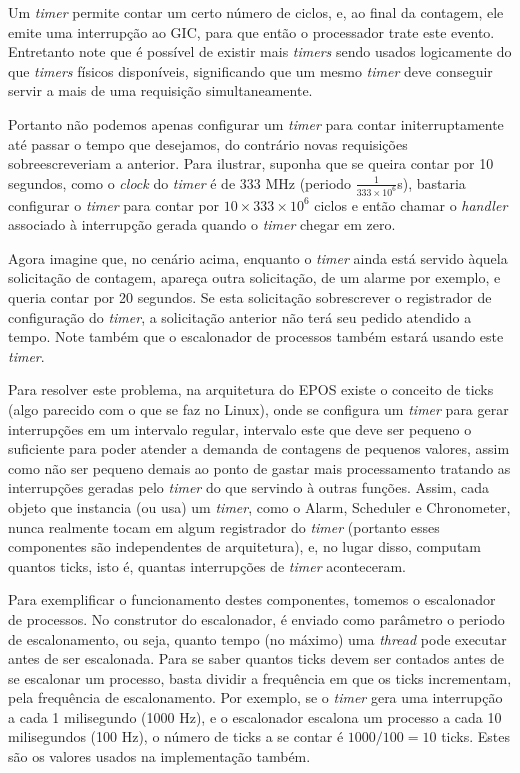 Um \emph{timer} permite contar um certo número de ciclos, e, ao final da contagem, ele emite uma interrupção ao GIC, para que então o processador trate este evento. Entretanto note que é possível de existir mais \emph{timers} sendo usados logicamente do que \emph{timers} físicos disponíveis, significando que um mesmo \emph{timer} deve conseguir servir a mais de uma requisição simultaneamente.

Portanto não podemos apenas configurar um \emph{timer} para contar initerruptamente até passar o tempo que desejamos, do contrário novas requisições sobreescreveriam a anterior. Para ilustrar, suponha que se queira contar por 10 segundos, como o \emph{clock} do \emph{timer} é de 333 MHz (periodo $\frac{1}{333 \times 10^6}$s), bastaria configurar o \emph{timer} para contar por $10 \times 333 \times 10^6$ ciclos e então chamar o \emph{handler} associado à interrupção gerada quando o \emph{timer} chegar em zero.

Agora imagine que, no cenário acima, enquanto o \emph{timer} ainda está servido àquela solicitação de contagem, apareça outra solicitação, de um alarme por exemplo, e queria contar por 20 segundos. Se esta solicitação sobrescrever o registrador de configuração do \emph{timer}, a solicitação anterior não terá seu pedido atendido a tempo. Note também que o escalonador de processos também estará usando este \emph{timer}.

Para resolver este problema, na arquitetura do EPOS existe o conceito de ticks (algo parecido com o que se faz no Linux), onde se configura um \emph{timer} para gerar interrupções em um intervalo regular, intervalo este que deve ser pequeno o suficiente para poder atender a demanda de contagens de pequenos valores, assim como não ser pequeno demais ao ponto de gastar mais processamento tratando as interrupções geradas pelo \emph{timer} do que servindo à outras funções. Assim, cada objeto que instancia (ou usa) um \emph{timer}, como o Alarm, Scheduler e Chronometer, nunca realmente tocam em algum registrador do \emph{timer} (portanto esses componentes são independentes de arquitetura), e, no lugar disso, computam quantos ticks, isto é, quantas interrupções de \emph{timer} aconteceram.

Para exemplificar o funcionamento destes componentes, tomemos o escalonador de processos. No construtor do escalonador, é enviado como parâmetro o periodo de escalonamento, ou seja, quanto tempo (no máximo) uma \emph{thread} pode executar antes de ser escalonada. Para se saber quantos ticks devem ser contados antes de se escalonar um processo, basta dividir a frequência em que os ticks incrementam, pela frequência de escalonamento. Por exemplo, se o \emph{timer} gera uma interrupção a cada 1 milisegundo (1000 Hz), e o escalonador escalona um processo a cada 10 milisegundos (100 Hz), o número de ticks a se contar é $1000/100 = 10$ ticks. Estes são os valores usados na implementação também.

